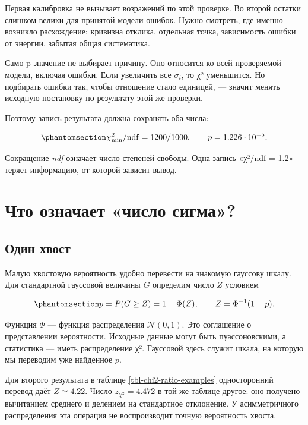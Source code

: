 \documentclass[
  russian,
  11pt,
  a4paper,
  open=any]{scrbook}
\begin{document}
Первая калибровка не вызывает возражений по этой проверке. Во второй
остатки слишком велики для принятой модели ошибок. Нужно смотреть, где
именно возникло расхождение: кривизна отклика, отдельная точка,
зависимость ошибки от энергии, забытая общая систематика.

Само p-значение не выбирает причину. Оно относится ко всей проверяемой
модели, включая ошибки. Если увеличить все \(\sigma_i\), то χ²
уменьшится. Но подбирать ошибки так, чтобы отношение стало единицей, ---
значит менять исходную постановку по результату этой же проверки.

Поэтому запись результата должна сохранять оба числа:

\begin{equation}\protect\phantomsection\label{eq-ch13-report-fit}{
\chi^2_{\min}/\mathrm{ndf}=1200/1000,
\qquad p=1.226\cdot10^{-5}.
}\end{equation}

Сокращение \emph{ndf} означает число степеней свободы. Одна запись
«χ²/ndf = 1.2» теряет информацию, от которой зависит вывод.

\section{Что означает «число
сигма»?}\label{ux447ux442ux43e-ux43eux437ux43dux430ux447ux430ux435ux442-ux447ux438ux441ux43bux43e-ux441ux438ux433ux43cux430}

\subsection{Один хвост}\label{interactive-goodness-p-to-z-one-sided}

Малую хвостовую вероятность удобно перевести на знакомую гауссову шкалу.
Для стандартной гауссовой величины \(G\) определим число \(Z\) условием

\begin{equation}\protect\phantomsection\label{eq-ch13-one-sided-significance}{
p=P(G\ge Z)=1-\Phi(Z),
\qquad Z=\Phi^{-1}(1-p).
}\end{equation}

Функция \(\Phi\) --- функция распределения \(\mathcal N(0,1)\). Это
соглашение о представлении вероятности. Исходные данные могут быть
пуассоновскими, а статистика --- иметь распределение χ². Гауссовой здесь
служит шкала, на которую мы переводим уже найденное \(p\).

Для второго результата в таблице \ref{tbl-chi2-ratio-examples}
односторонний перевод даёт \(Z\simeq4.22\). Число \(z_{\chi^2}=4.472\) в
той же таблице другое: оно получено вычитанием среднего и делением на
стандартное отклонение. У асимметричного распределения эта операция не
воспроизводит точную вероятность хвоста.
\end{document}
